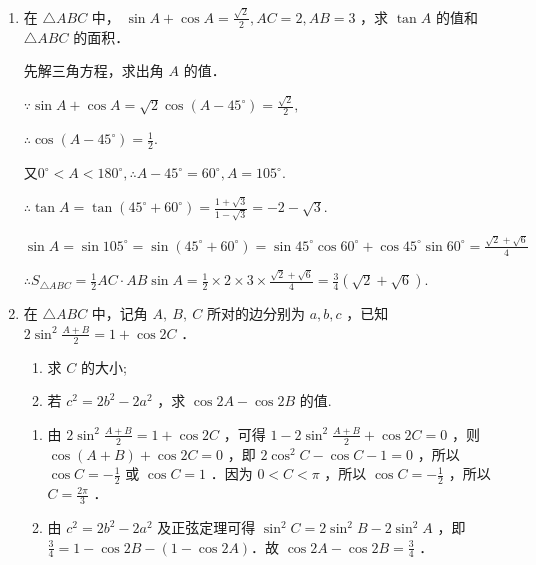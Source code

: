 \begin{enumerate}
\item 在 $\triangle A B C$ 中， $\sin A+\cos A=\frac{\sqrt{2}}{2}, A C=2, A B=3$ ，求 $\tan A$ 的值和 $\triangle A B C$ 的面积．
\begin{jieda}
先解三角方程，求出角 $A$ 的值．

$\because \sin A+\cos A=\sqrt{2} \cos \left(A-45^{\circ}\right)=\frac{\sqrt{2}}{2}, $

$\therefore \cos \left(A-45^{\circ}\right)=\frac{1}{2}.$

又$0^{\circ}<A<180^{\circ}, \therefore A-45^{\circ}=60^{\circ}, A=105^{\circ}. $

$\therefore \tan A=\tan \left(45^{\circ}+60^{\circ}\right)=\frac{1+\sqrt{3}}{1-\sqrt{3}}=-2-\sqrt{3} . $

$\sin A=\sin 105^{\circ}=\sin \left(45^{\circ}+60^{\circ}\right)=\sin 45^{\circ} \cos 60^{\circ}+\cos 45^{\circ} \sin 60^{\circ}=\frac{\sqrt{2}+\sqrt{6}}{4}$

$\therefore S_{\triangle A B C}=\frac{1}{2} A C \cdot A B \sin A=\frac{1}{2} \times 2 \times 3 \times \frac{\sqrt{2}+\sqrt{6}}{4}=\frac{3}{4}(\sqrt{2}+\sqrt{6}) .$

\end{jieda}

\item 在 $\triangle A B C$ 中，记角 $A, ~ B, ~ C$ 所对的边分别为 $a, b, c$ ，已知 $2 \sin ^2 \frac{A+B}{2}=1+\cos 2 C$ ．
\begin{enumerate}
    \item 求 $C$ 的大小;
    \item 若 $c^2=2 b^2-2 a^2$ ，求 $\cos 2 A-\cos 2 B$ 的值.
\end{enumerate}
\begin{jieda}
    \begin{enumerate}
        \item 由 $2 \sin ^2 \frac{A+B}{2}=1+\cos 2 C$ ，可得 $1-2 \sin ^2 \frac{A+B}{2}+\cos 2 C=0$ ，则 $\cos (A+B)+\cos 2 C=0$ ，即 $2 \cos ^2 C-\cos C-1=0$ ，所以 $\cos C=-\frac{1}{2}$ 或 $\cos C=1$ ．因为 $0<C<\pi$ ，所以 $\cos C=-\frac{1}{2}$ ，所以 $C=\frac{2 \pi}{3}$ ．
        \item 由 $c^2=2 b^2-2 a^2$ 及正弦定理可得 $\sin ^2 C=2 \sin ^2 B-2 \sin ^2 A$ ，即 $\frac{3}{4}=1-\cos 2 B-(1-\cos 2 A)$．故 $\cos 2 A-\cos 2 B=\frac{3}{4}$ ．
    \end{enumerate}
\end{jieda}

\end{enumerate}

